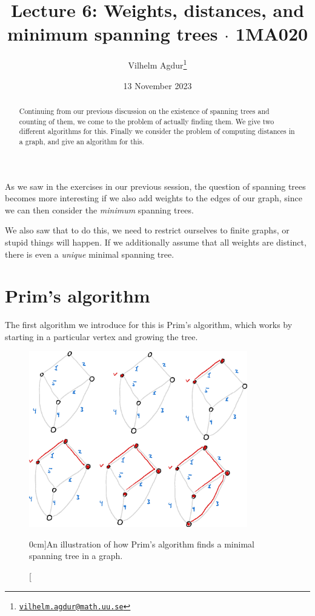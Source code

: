 \documentclass[nobib]{tufte-handout}
\title{Lecture 6: Weights, distances, and minimum spanning trees $\cdot$ 1MA020}
\author[Vilhelm Agdur]{Vilhelm Agdur\thanks{\href{mailto:vilhelm.agdur@math.uu.se}{\nolinkurl{vilhelm.agdur@math.uu.se}}}}
\date{13 November 2023}
\begin{document}
\maketitle%

\begin{abstract}
\noindent
Continuing from our previous discussion on the existence of spanning trees and counting of them, we come to the problem of actually finding them. We give two different algorithms for this. Finally we consider the problem of computing distances in a graph, and give an algorithm for this.
\end{abstract}

As we saw in the exercises in our previous session, the question of spanning trees becomes more interesting if we also add weights to the edges of our graph, since we can then consider the \emph{minimum} spanning trees.

We also saw that to do this, we need to restrict ourselves to finite graphs, or stupid things will happen. If we additionally assume that all weights are distinct, there is even a \emph{unique} minimal spanning tree.

\section{Prim's algorithm}

The first algorithm we introduce for this is Prim's algorithm, which works by starting in a particular vertex and growing the tree.

\begin{figure}
  \centering
  \includegraphics[width=0.85\textwidth]{graphics/L6_prim_kruskal_dijkstra/prims_algorithm.png}
  \caption[][0cm]{An illustration of how Prim's algorithm finds a minimal spanning tree in a graph.}
  \label{fig:prims_algorithm}
\end{figure}
\end{document}
